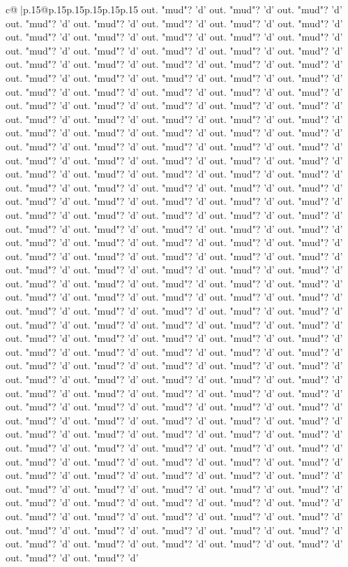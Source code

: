 \documentclass{article}
\begin{document}
{\begin{supertabular}{c@{$\;$}|p{.15\linewidth}@{}p{.15\linewidth}p{.15\linewidth}p{.15\linewidth}p{.15\linewidth}p{.15\linewidth}}
{{{out. "mud"? 'd' out. "mud"? 'd' out. "mud"? 'd' out. "mud"? 'd' out. "mud"? 'd' out. "mud"? 'd' out. "mud"? 'd' out. "mud"? 'd' out. "mud"? 'd' out. "mud"? 'd' out. "mud"? 'd' out. "mud"? 'd' out. "mud"? 'd' out. "mud"? 'd' out. "mud"? 'd' out. "mud"? 'd' out. "mud"? 'd' out. "mud"? 'd' out. "mud"? 'd' out. "mud"? 'd' out. "mud"? 'd' out. "mud"? 'd' out. "mud"? 'd' out. "mud"? 'd' out. "mud"? 'd' out. "mud"? 'd' out. "mud"? 'd' out. "mud"? 'd' out. "mud"? 'd' out. "mud"? 'd' out. "mud"? 'd' out. "mud"? 'd' out. "mud"? 'd' out. "mud"? 'd' out. "mud"? 'd' out. "mud"? 'd' out. "mud"? 'd' out. "mud"? 'd' out. "mud"? 'd' out. "mud"? 'd' out. "mud"? 'd' out. "mud"? 'd' out. "mud"? 'd' out. "mud"? 'd' out. "mud"? 'd' out. "mud"? 'd' out. "mud"? 'd' out. "mud"? 'd' out. "mud"? 'd' out. "mud"? 'd' out. "mud"? 'd' out. "mud"? 'd' out. "mud"? 'd' out. "mud"? 'd' out. "mud"? 'd' out. "mud"? 'd' out. "mud"? 'd' out. "mud"? 'd' out. "mud"? 'd' out. "mud"? 'd' out. "mud"? 'd' out. "mud"? 'd' out. "mud"? 'd' out. "mud"? 'd' out. "mud"? 'd' out. "mud"? 'd' out. "mud"? 'd' out. "mud"? 'd' out. "mud"? 'd' out. "mud"? 'd' out. "mud"? 'd' out. "mud"? 'd' out. "mud"? 'd' out. "mud"? 'd' out. "mud"? 'd' out. "mud"? 'd' out. "mud"? 'd' out. "mud"? 'd' out. "mud"? 'd' out. "mud"? 'd' out. "mud"? 'd' out. "mud"? 'd' out. "mud"? 'd' out. "mud"? 'd' out. "mud"? 'd' out. "mud"? 'd' out. "mud"? 'd' out. "mud"? 'd' out. "mud"? 'd' out. "mud"? 'd' out. "mud"? 'd' out. "mud"? 'd' out. "mud"? 'd' out. "mud"? 'd' out. "mud"? 'd' out. "mud"? 'd' out. "mud"? 'd' out. "mud"? 'd' out. "mud"? 'd' out. "mud"? 'd' out. "mud"? 'd' out. "mud"? 'd' out. "mud"? 'd' out. "mud"? 'd' out. "mud"? 'd' out. "mud"? 'd' out. "mud"? 'd' out. "mud"? 'd' out. "mud"? 'd' out. "mud"? 'd' out. "mud"? 'd' out. "mud"? 'd' out. "mud"? 'd' out. "mud"? 'd' out. "mud"? 'd' out. "mud"? 'd' out. "mud"? 'd' out. "mud"? 'd' out. "mud"? 'd' out. "mud"? 'd' out. "mud"? 'd' out. "mud"? 'd' out. "mud"? 'd' out. "mud"? 'd' out. "mud"? 'd' out. "mud"? 'd' out. "mud"? 'd' out. "mud"? 'd' out. "mud"? 'd' out. "mud"? 'd' out. "mud"? 'd' out. "mud"? 'd' out. "mud"? 'd' out. "mud"? 'd' out. "mud"? 'd' out. "mud"? 'd' out. "mud"? 'd' out. "mud"? 'd' out. "mud"? 'd' out. "mud"? 'd' out. "mud"? 'd' out. "mud"? 'd' out. "mud"? 'd' out. "mud"? 'd' out. "mud"? 'd' out. "mud"? 'd' out. "mud"? 'd' out. "mud"? 'd' out. "mud"? 'd' out. "mud"? 'd' out. "mud"? 'd' out. "mud"? 'd' out. "mud"? 'd' out. "mud"? 'd' out. "mud"? 'd' out. "mud"? 'd' out. "mud"? 'd' out. "mud"? 'd' out. "mud"? 'd' out. "mud"? 'd' out. "mud"? 'd' out. "mud"? 'd' out. "mud"? 'd' out. "mud"? 'd' out. "mud"? 'd' out. "mud"? 'd' out. "mud"? 'd' out. "mud"? 'd' out. "mud"? 'd' out. "mud"? 'd' out. "mud"? 'd' out. "mud"? 'd' out. "mud"? 'd' out. "mud"? 'd' out. "mud"? 'd' out. "mud"? 'd' out. "mud"? 'd' out. "mud"? 'd' out. "mud"? 'd' out. "mud"? 'd' out. "mud"? 'd' out. "mud"? 'd' out. "mud"? 'd' out. "mud"? 'd' out. "mud"? 'd' out. "mud"? 'd' out. "mud"? 'd' out. "mud"? 'd' out. "mud"? 'd' out. "mud"? 'd' out. "mud"? 'd' out. "mud"? 'd' out. "mud"? 'd' out. "mud"? 'd' out. "mud"? 'd' out. "mud"? 'd' out. "mud"? 'd' out. "mud"? 'd' out. "mud"? 'd' out. "mud"? 'd' }}}
\end{supertabular}}
\end{document}
